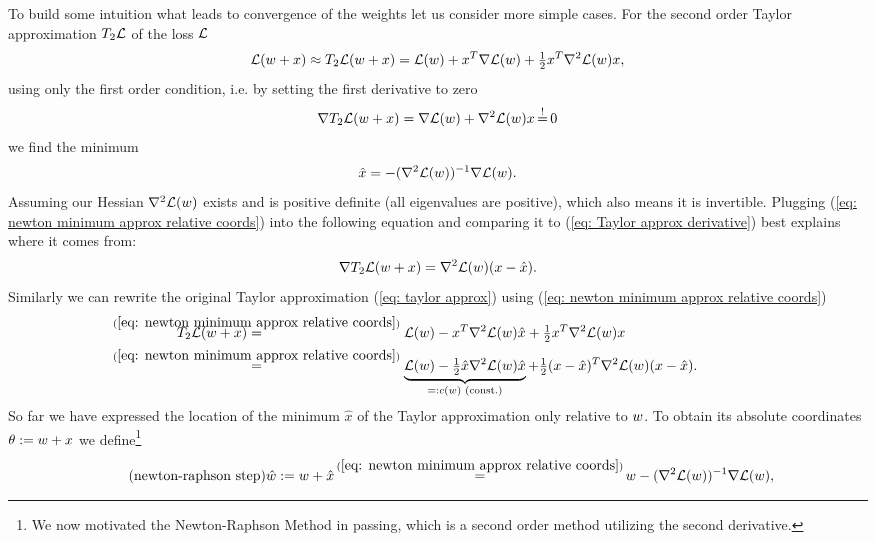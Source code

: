 To build some intuition what leads to convergence of the weights let us consider
more simple cases. For the second order Taylor approximation \(T_2\mathcal{L}\) of the
loss \(\mathcal{L}\)
%
\begin{align}\label{eq: taylor approx}
	\mathcal{L}(w+x) \approx T_2\mathcal{L}(w+x)
	= \mathcal{L}(w) + x^T \nabla \mathcal{L}(w) + \tfrac12 x^T \nabla^2 \mathcal{L}(w) x,
\end{align}
%
using only the first order condition, i.e. by setting the first derivative to zero
%
\begin{align}\label{eq: Taylor approx derivative}
	\nabla T_2\Loss(\weights+x) = \nabla \Loss(\weights) + \nabla^2\Loss(\weights) x \xeq{!} 0
\end{align}
%
we find the minimum 
%
\begin{align}\label{eq: newton minimum approx relative coords}
	\hat{x} = -(\nabla^2 \mathcal{L}(w))^{-1}\nabla \mathcal{L}(w).
\end{align}
%
Assuming our Hessian \(\nabla^2 \mathcal{L}(w)\) exists and is
positive definite (all eigenvalues are positive), which also means it is invertible.
Plugging (\ref{eq: newton minimum approx relative coords}) into the
following equation and comparing it to (\ref{eq: Taylor approx derivative})
best explains where it comes from:
%
\begin{align*}
	\nabla T_2\mathcal{L}(w+x) = \nabla^2 \mathcal{L}(w)(x-\hat{x}).
\end{align*}
%
Similarly we can rewrite the original Taylor approximation (\ref{eq: taylor
approx}) using (\ref{eq: newton minimum approx relative coords})
%
\begin{align*}
	T_2\Loss(\weights+x)
	&\lxeq{(\ref{eq: newton minimum approx relative coords})} \Loss(\weights) - x^T \nabla^2 \Loss(\weights) \hat{x} + \tfrac12 x^T \nabla^2 \Loss(\weights) x \\
	&\lxeq{(\ref{eq: newton minimum approx relative coords})} \underbrace{
		\Loss(\weights) - \tfrac12 \hat{x} \nabla^2 \Loss(\weights) \hat{x}
	}_{
		=: c(\weights) \text{ (const.)}
	} + \tfrac12 (x-\hat{x})^T \nabla^2 \Loss(\weights)(x-\hat{x}).
\end{align*}
%
So far we have expressed the location of the minimum \(\hat{x}\) of the Taylor
approximation only relative to \(w\). To obtain its absolute coordinates
\(\theta:=w+x\) we define\footnote{
	We now motivated the Newton-Raphson Method in passing, which is a second
	order method utilizing the second derivative.
}
%
\begin{align}\label{eq: newton minimum approx}
	\tag{newton-raphson step}
	\hat{\weights} := \weights + \hat{x}
	\xeq{(\ref{eq: newton minimum approx relative coords})}
	\weights -(\nabla^2 \Loss(\weights))^{-1}\nabla \Loss(\weights),
\end{align}
